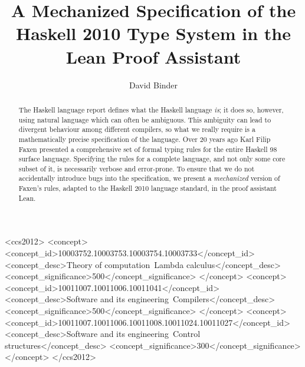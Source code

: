 \documentclass[acmsmall, screen, review]{acmart}
\begin{document}
\title{A Mechanized Specification of the Haskell 2010 Type System in the Lean Proof Assistant}



\begin{CCSXML}
  <ccs2012>
     <concept>
         <concept_id>10003752.10003753.10003754.10003733</concept_id>
         <concept_desc>Theory of computation~Lambda calculus</concept_desc>
         <concept_significance>500</concept_significance>
         </concept>
     <concept>
         <concept_id>10011007.10011006.10011041</concept_id>
         <concept_desc>Software and its engineering~Compilers</concept_desc>
         <concept_significance>500</concept_significance>
         </concept>
     <concept>
         <concept_id>10011007.10011006.10011008.10011024.10011027</concept_id>
         <concept_desc>Software and its engineering~Control structures</concept_desc>
         <concept_significance>300</concept_significance>
         </concept>
   </ccs2012>
\end{CCSXML}


\author{David Binder}



\begin{abstract}
  The Haskell language report defines what the Haskell language \emph{is}; it does so, however, using natural language which can often be ambiguous.
  This ambiguity can lead to divergent behaviour among different compilers, so what we really require is a mathematically precise
  specification of the language.
  Over 20 years ago Karl Filip Faxen presented a comprehensive set of formal typing rules for the entire Haskell 98 surface language.
  Specifying the rules for a complete language, and not only some core subset of it, is necessarily verbose and error-prone.
  To ensure that we do not accidentally introduce bugs into the specification, we present a \emph{mechanized} version of Faxen's rules, adapted to the Haskell 2010 language standard, in the proof assistant Lean.
\end{abstract}
\end{document}
